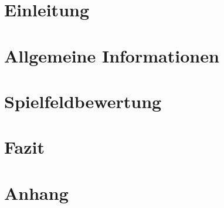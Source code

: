 \documentclass[12pt,a4paper,bibliography=totocnumbered,listof=totocnumbered]{article}
\begin{document}
\section{Einleitung}\label{sec:einleitung}


\section{Allgemeine Informationen}\label{sec:allgemeine-informationen}


\section{Spielfeldbewertung}\label{sec:spielfeldbewertung}


\section{Fazit}\label{sec:fazit}


\section{Anhang}\label{sec:anhang}

\end{document}
